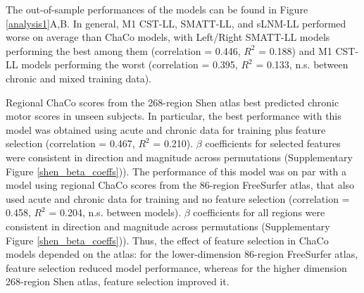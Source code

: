 \documentclass[10pt]{article}
\begin{document}
The out-of-sample performances of the models can be found in Figure \ref{analysis1}A,B. In general, M1 CST-LL, SMATT-LL, and sLNM-LL performed worse on average than ChaCo models, with Left/Right SMATT-LL models performing the best among them (correlation = 0.446, $R^2$ = 0.188) and M1 CST-LL models performing the worst (correlation = 0.395, $R^2$ = 0.133, n.s. between chronic and mixed training data). 

Regional ChaCo scores from the 268-region Shen atlas best predicted chronic motor scores in unseen subjects. In particular, the best performance with this model was obtained using acute and chronic data for training plus feature selection (correlation = 0.467, $R^2$ = 0.210). $\beta$ coefficients for selected features were consistent in direction and magnitude across permutations (Supplementary Figure \ref{shen_beta_coeffs})). The performance of this model was on par with a model using regional ChaCo scores from the 86-region FreeSurfer atlas, that also used acute and chronic data for training and no feature selection (correlation = 0.458, $R^2$ = 0.204, n.s. between models). $\beta$ coefficients for all regions were consistent in direction and magnitude across permutations (Supplementary Figure  \ref{shen_beta_coeffs})).  Thus, the effect of feature selection in ChaCo models depended on the atlas: for the lower-dimension 86-region FreeSurfer atlas, feature selection reduced model performance, whereas for the higher dimension 268-region Shen atlas, feature selection improved it. 
\end{document}
